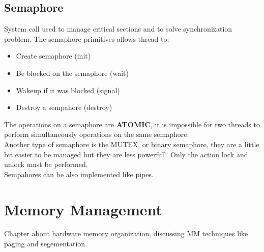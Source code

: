 \documentclass[12pt]{article}
\begin{document}
\subsection{Semaphore}
System call used to manage critical sections and to solve synchronization problem. The semaphore primitives allows thread to:
\begin{itemize}
  \item Create semaphore (init)
  \item Be blocked on the semaphore (wait)
  \item Wakeup if it was blocked (signal)
  \item Destroy a sempahore (destroy)
\end{itemize}
The operations on a semaphore are \textbf{ATOMIC}, it is impossible for two threads to perform simultaneously operations on the same semaphore.\\
Another type of semaphore is the MUTEX, or binary semaphore, they are a little bit easier to be managed but they are less powerfull. Only the action lock and unlock must be performed.\\
Sempahores can be also implemented like pipes.

\section{Memory Management}
Chapter about hardware memory organization, discussing MM techniques like paging and segementation.
\end{document}
